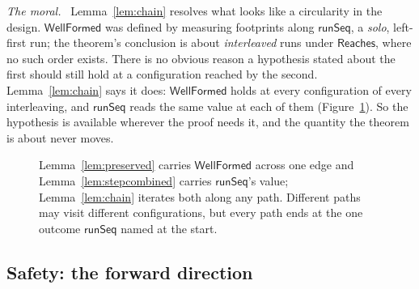 \documentclass[11pt,a4paper]{article}
\theoremstyle{definition}
\theoremstyle{plain}
\theoremstyle{remark}
\newenvironment{moral}{\par\medskip\noindent\textit{The moral.}\ \ignorespaces}{\par\medskip}
\newcommand{\runSeq}{\mathsf{runSeq}}
\newcommand{\wf}{\mathsf{WellFormed}}
\newcommand{\Reaches}{\mathsf{Reaches}}
\begin{document}
\begin{moral}
Lemma~\ref{lem:chain} resolves what looks like a circularity in the design. $\wf$ was defined
by measuring footprints along $\runSeq$, a \emph{solo}, left-first run; the theorem's
conclusion is about \emph{interleaved} runs under $\Reaches$, where no such order exists.
There is no obvious reason a hypothesis stated about the first should still hold at a
configuration reached by the second. Lemma~\ref{lem:chain} says it does: $\wf$ holds at every
configuration of every interleaving, and $\runSeq$ reads the same value at each of them
(Figure~\ref{fig:invariant}). So the hypothesis is available wherever the proof needs it, and
the quantity the theorem is about never moves.
\end{moral}

\begin{figure}[htb]
\centering
{}
\caption{Lemma~\ref{lem:preserved} carries $\wf$ across one edge and
Lemma~\ref{lem:stepcombined} carries $\runSeq$'s value; Lemma~\ref{lem:chain} iterates both
along any path. Different paths may visit different configurations, but every path ends at
the one outcome $\runSeq$ named at the start.}\label{fig:invariant}
\end{figure}

\subsection{Safety: the forward direction}\label{sec:canonical:safe}
\end{document}
